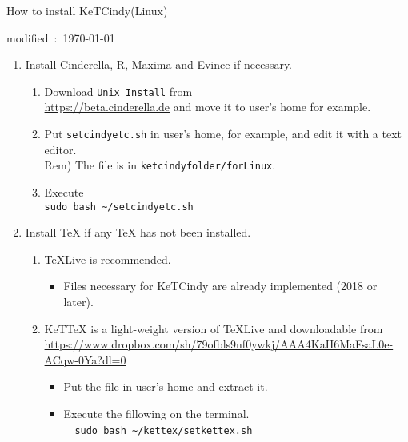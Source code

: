 \documentclass{article}
\begin{document}
\begin{center}
How to install KeTCindy(Linux)
\end{center}

\hfill modified\ :\ \today

\begin{enumerate}[\bf\large 1.]

\item Install Cinderella, R, Maxima and Evince if necessary.
    \begin{enumerate}[(1)]
    \item Download \verb|Unix Install| from \\
       \hspace*{10mm}\url{https://beta.cinderella.de} 
    and move it to user's home for example.
    \item Put \verb|setcindyetc.sh| in user's home, for example, and edit it with a text editor.\\
    \hspace*{5mm}Rem) The file is in \verb|ketcindyfolder/forLinux|.
    \item Execute\\
       \hspace*{10mm}\verb|sudo bash ~/setcindyetc.sh|
    \end{enumerate}

\item Install TeX if any TeX has not been installed.
  \begin{enumerate}[(1)]
  \item TeXLive is recommended.
    \begin{itemize}
    \item Files necessary for KeTCindy are already implemented (2018 or later).
    \end{itemize}
  \item KeTTeX is a light-weight version of TeXLive and downloadable from\\
  \hspace*{6mm}\url{https://www.dropbox.com/sh/79ofbls9nf0ywkj/AAA4KaH6MaFsaL0e-ACqw-0Ya?dl=0}
    \begin{itemize}
    \item Put the file in user's home and extract it.
    \item Execute the fillowing on the terminal.\\
　\hspace*{10mm}\verb|sudo bash ~/kettex/setkettex.sh|
    \end{itemize}
 \end{enumerate}


\end{enumerate}
\end{document}
